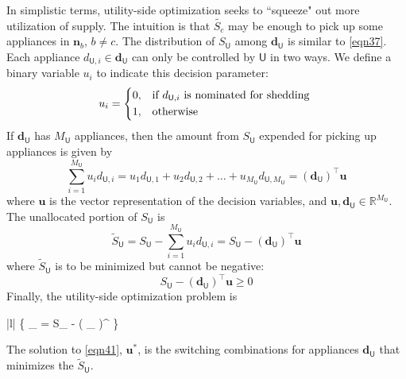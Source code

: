 \documentclass[conference, a4paper]{IEEEtran}
\begin{document}
In simplistic terms, utility-side optimization seeks to ``squeeze" out more utilization of supply.
The intuition is that $\tilde{S_{c}}$ may be enough to pick up some appliances in $\mathbf{n}_{b}$, $b \neq c$.
The distribution of $S_{\mathsf{U}}$ among $\mathbf{d}_{\mathsf{U}}$ is similar to \eqref{eqn37}.
Each appliance $d_{\mathsf{U},i} \in \mathbf{d}_{\mathsf{U}}$ can only be controlled by $\mathsf{U}$ in two ways.
We define a binary variable $u_{i}$ to indicate this decision parameter:
\begin{equation}
	u_{i} =
	\begin{cases*}
		0, & if $d_{\mathsf{U},i}$ is nominated for shedding \\
		1, & otherwise
	\end{cases*}
	\label{eqn38}
\end{equation}
If $\mathbf{d}_{\mathsf{U}}$ has $M_{\mathsf{U}}$ appliances, then the amount from $S_{\mathsf{U}}$ expended for picking up appliances is given by
\begin{equation*}
	\sum_{i=1}^{M_{\mathsf{U}}} u_{i} d_{\mathsf{U},i} = u_{1} d_{\mathsf{U},1} + u_{2} d_{\mathsf{U},2} + \ldots + u_{M_{\mathsf{U}}} d_{\mathsf{U},M_{\mathsf{U}}} = \left( \mathbf{d}_{\mathsf{U}} \right)^{\intercal} \mathbf{u}
\end{equation*}
where $\mathbf{u}$ is the vector representation of the decision variables,
and $\mathbf{u}, \mathbf{d}_{\mathsf{U}} \in \mathbb{R}^{M_{\mathsf{U}}}$.
The unallocated portion of $S_{\mathsf{U}}$ is
\begin{equation}
	\tilde{S}_{\mathsf{U}} = S_{\mathsf{U}} - \sum_{i=1}^{M_{\mathsf{U}}} u_{i} d_{\mathsf{U},i} = S_{\mathsf{U}} - \left( \mathbf{d}_{\mathsf{U}} \right)^{\intercal} \mathbf{u}
	\label{eqn39}
\end{equation}
where $\tilde{S}_{\mathsf{U}}$ is to be minimized but cannot be negative:
\begin{equation}
	S_{\mathsf{U}} - \left( \mathbf{d}_{\mathsf{U}} \right)^{\intercal} \mathbf{u} \geq 0
	\label{eqn40}
\end{equation}
Finally, the utility-side optimization problem is
\begin{mini!}|l|
	{}
	{ \left\{ _{} = S_{} - \left( _{} \right)^{\intercal}  \right\} }
	{\label{eqn41}}
	{}{}
\end{mini!}
The solution to \eqref{eqn41}, $\mathbf{u}^{\ast}$, is the switching combinations for appliances $\mathbf{d}_{\mathsf{U}}$ that minimizes the $\tilde{S}_{\mathsf{U}}$.
\end{document}
